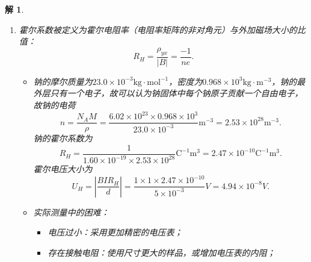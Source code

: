 \documentclass[UTF8,10pt,a4paper]{article}
\theoremstyle{Problem}
\theoremstyle{Solution}
\newtheorem*{sol}{解}
\begin{document}
\begin{sol}
\begin{enumerate}
\begin{equation}
            \underaccent{\tilde}{\sigma}=\underaccent{\tilde}{\rho}^{-1}=\left(\begin{matrix}
                \frac{\frac{m}{ne^2\tau}}{\left(\frac{m}{ne^2\tau}\right)^2+\left(\frac{B}{ne}\right)^2}&\frac{-\frac{B}{ne}}{\left(\frac{m}{ne^2\tau}\right)^2+\left(\frac{B}{ne}\right)^2}&0\\
                \frac{\frac{B}{ne}}{\left(\frac{m}{ne^2\tau}\right)^2+\left(\frac{B}{ne}\right)^2}&\frac{\frac{m}{ne^2\tau}}{\left(\frac{m}{ne^2\tau}\right)^2+\left(\frac{B}{ne}\right)^2}&0\\
                0&0&\frac{ne^2\tau}{m}
            \end{matrix}\right).
        \end{equation}
        \item[(c)] 霍尔系数被定义为霍尔电阻率（电阻率矩阵的非对角元）与外加磁场大小的比值：
        \begin{equation}
            R_H=\frac{\rho_{yx}}{|B|}=\frac{-1}{ne}.
        \end{equation}
        \begin{itemize}
            \item[$\triangleright$] 钠的摩尔质量为$23.0\times 10^{-3}\text{kg}\cdot\text{mol}^{-1}$，密度为$0.968\times 10^3\text{kg}\cdot\text{m}^{-3}$，钠的最外层只有一个电子，故可以认为钠固体中每个钠原子贡献一个自由电子，故钠的电荷
            \begin{equation}
                n=\frac{N_AM}{\rho}=\frac{6.02\times 10^{23}\times 0.968\times 10^3}{23.0\times 10^{-3}}\text{m}^{-3}=2.53\times 10^28\text{m}^{-3}.
            \end{equation}
            钠的霍尔系数为
            \begin{equation}
                R_H=\frac{1}{1.60\times 10^{-19}\times 2.53\times 10^{28}}\text{C}^{-1}\text{m}^3=2.47\times 10^{-10}\text{C}^{-1}\text{m}^3.
            \end{equation}
            霍尔电压大小为
            \begin{equation}
                U_H=\left\lvert\frac{BIR_H}{d}\right\rvert=\frac{1\times 1\times 2.47\times 10^{-10}}{5\times 10^{-3}}V=4.94\times 10^{-8}V.
            \end{equation}
            \item[$\triangleright$] 实际测量中的困难：
            \begin{itemize}
                \item 电压过小：采用更加精密的电压表；
                \item 存在接触电阻：使用尺寸更大的样品，或增加电压表的内阻；

\end{itemize}
\end{itemize}
\end{enumerate}
\end{sol}
\end{document}
